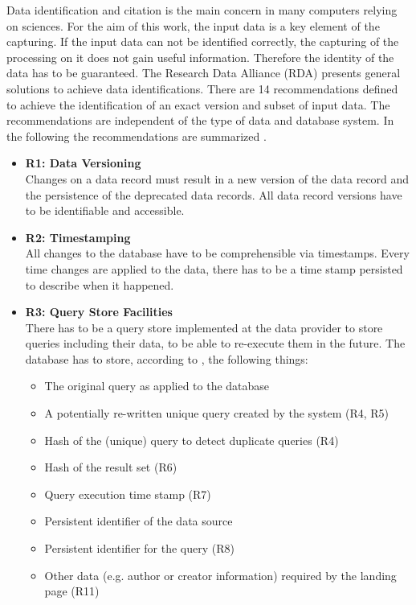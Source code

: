 \documentclass[draft,final]{vutinfth} %
\begin{document}
Data identification and citation is the main concern in many computers relying on sciences. For the aim of this work, the input data is a key element of the capturing. If the input data can not be identified correctly, the capturing of the processing on it does not gain useful information. Therefore the identity of the data has to be guaranteed. The Research Data Alliance (RDA) presents general solutions to achieve data identifications. There are 14 recommendations defined to achieve the identification of an exact version and subset of input data. The recommendations are independent of the type of data and database system. In the following the recommendations are summarized \cite{rauber2016identification}.

\begin{itemize}
	\item \textbf{R1: Data Versioning} \\
	Changes on a data record must result in a new version of the data record and the persistence of the deprecated data records. All data record versions have to be identifiable and accessible. 
	\item \textbf{R2: Timestamping} \\
	All changes to the database have to be comprehensible via timestamps. Every time changes are applied to the data, there has to be a time stamp persisted to describe when it happened. 
	\item \textbf{R3: Query Store Facilities} \\
	There has to be a query store implemented at the data provider to store queries including their data, to be able to re-execute them in the future. The database has to store, according to \cite{rauber2016identification}, the following things: 
	\begin{itemize}
		\item The original query as applied to the database
		\item A potentially re-written unique query created by the system (R4, R5)
		\item Hash of the (unique) query to detect duplicate queries (R4)
		\item Hash of the result set (R6)
		\item Query execution time stamp (R7)
		\item Persistent identifier of the data source
		\item Persistent identifier for the query (R8)
		\item Other data (e.g. author or creator information) required by the landing page (R11)

\end{itemize}
\end{itemize}
\end{document}
